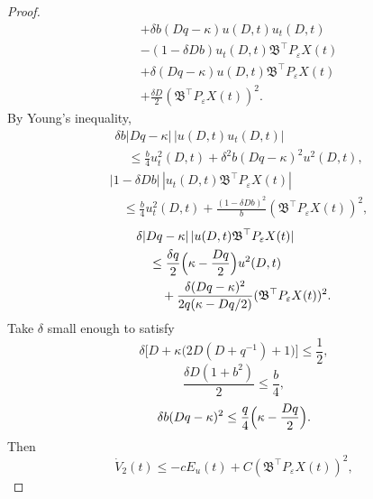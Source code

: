 \documentclass{IEEEtran}
\theoremstyle{definition}
\begin{document}
\begin{proof}
\begin{equation}
\begin{aligned}
 &+\delta b(Dq-\kappa)u(D,t)u_t(D,t)\\
 &-(1-\delta Db)u_t(D,t)\mathfrak B^\top P_\varepsilon X(t)\\
 &+\delta(Dq-\kappa)u(D,t)\mathfrak B^\top P_\varepsilon X(t)\\
 &+\frac{\delta D}{2}(\mathfrak B^\top P_\varepsilon X(t))^2.
\end{aligned}
\label{eq:V2dot}
\end{equation}
By Young's inequality,
\begin{equation}
\begin{aligned}
&\delta b|Dq-\kappa|\,|u(D,t)u_t(D,t)|\\
&\quad\leq\frac b4u_t^2(D,t)
 +\delta^2b(Dq-\kappa)^2u^2(D,t),
\end{aligned}
\label{eq:young1}
\end{equation}
\begin{equation}
\begin{aligned}
&|1-\delta Db|\,|u_t(D,t)\mathfrak B^\top P_\varepsilon X(t)|\\
&\quad\leq\frac b4u_t^2(D,t)
 +\frac{(1-\delta Db)^2}{b}(\mathfrak B^\top P_\varepsilon X(t))^2,
\end{aligned}
\label{eq:young2}
\end{equation}
\begin{equation}
\begin{aligned}
&\delta|Dq-\kappa|\,|u(D,t)\mathfrak B^\top P_\varepsilon X(t)|\\
&\quad\leq\frac{\delta q}{2}\Bigl(\kappa-\frac{Dq}{2}\Bigr)u^2(D,t)\\
&\qquad+\frac{\delta(Dq-\kappa)^2}{2q(\kappa-Dq/2)}
 (\mathfrak B^\top P_\varepsilon X(t))^2.
\end{aligned}
\label{eq:young3}
\end{equation}
Take $\delta$ small enough to satisfy
\begin{equation}
 \delta\bigl[D+\kappa\bigl(2D(D+q^{-1})+1\bigr)\bigr]\leq\frac12,
\label{eq:delta1}
\end{equation}
\begin{equation}
 \frac{\delta D(1+b^2)}2\leq\frac b4,
\label{eq:delta2}
\end{equation}
\begin{equation}
 \delta b(Dq-\kappa)^2\leq
     \frac q4\Bigl(\kappa-\frac{Dq}2\Bigr).
\label{eq:delta3}
\end{equation}
Then
\begin{equation}
 \dot V_2(t)\leq-cE_u(t)
   +C(\mathfrak B^\top P_\varepsilon X(t))^2,

\end{equation}
\end{proof}
\end{document}
